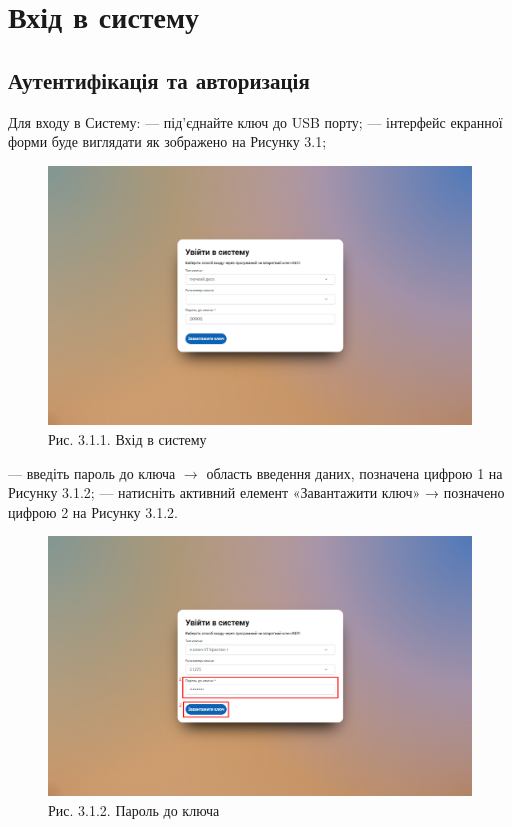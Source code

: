 \chapter{Вхід в систему}

\section{Аутентифікація та авторизація}

Для входу в Систему:
--- під’єднайте ключ до USB порту;
--- інтерфейс екранної форми буде виглядати як зображено на Рисунку 3.1;

\begin{figure}[!htbp]
\centerline{\includegraphics[width=\textwidth]{img/3.1.1.png}}
\caption{Рис. 3.1.1. Вхід в систему}
\end{figure}

\newpage

--- введіть пароль до ключа $\rightarrow$ область введення даних, позначена цифрою 1 на Рисунку 3.1.2;
--- натисніть активний елемент «Завантажити ключ» → позначено цифрою 2 на Рисунку 3.1.2.

\begin{figure}[!htbp]
\centerline{\includegraphics[width=\textwidth]{img/3.1.2.png}}
\caption{Рис. 3.1.2. Пароль до ключа}
\end{figure}


